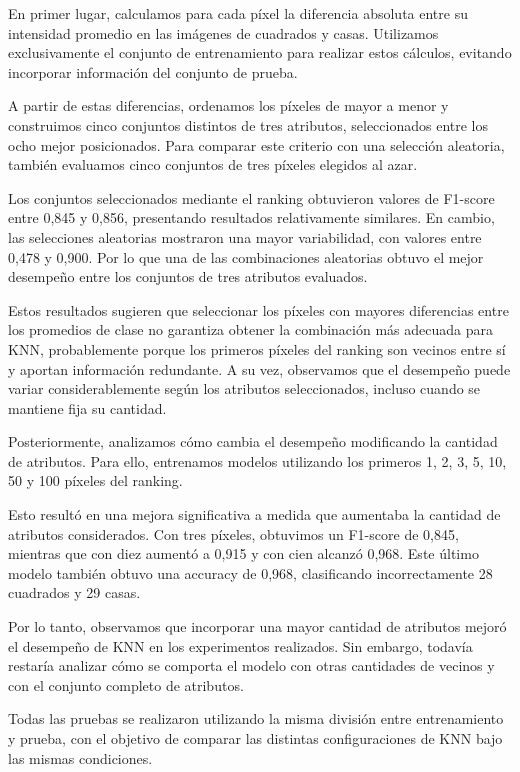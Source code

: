 \documentclass[11pt,a4paper]{article}
\begin{document}
En primer lugar, calculamos para cada píxel la
diferencia absoluta entre su intensidad promedio
en las imágenes de cuadrados y casas. Utilizamos
exclusivamente el conjunto de entrenamiento para
realizar estos cálculos, evitando incorporar
información del conjunto de prueba.

A partir de estas diferencias, ordenamos los píxeles
de mayor a menor y construimos cinco conjuntos
distintos de tres atributos, seleccionados entre
los ocho mejor posicionados. Para comparar este
criterio con una selección aleatoria, también
evaluamos cinco conjuntos de tres píxeles elegidos
al azar.

Los conjuntos seleccionados mediante el ranking
obtuvieron valores de F1-score entre 0,845 y 0,856,
presentando resultados relativamente similares.
En cambio, las selecciones aleatorias mostraron
una mayor variabilidad, con valores entre 0,478
y 0,900. Por lo que una de las combinaciones
aleatorias obtuvo el mejor desempeño entre los
conjuntos de tres atributos evaluados.

Estos resultados sugieren que seleccionar los
píxeles con mayores diferencias entre los promedios
de clase no garantiza obtener la combinación
más adecuada para KNN, probablemente porque los
primeros píxeles del ranking son vecinos entre sí
y aportan información redundante. A su vez, observamos 
que el desempeño puede variar considerablemente
según los atributos seleccionados, incluso
cuando se mantiene fija su cantidad.

Posteriormente, analizamos cómo cambia el desempeño
modificando la cantidad de atributos. Para ello,
entrenamos modelos utilizando los primeros 1, 2,
3, 5, 10, 50 y 100 píxeles del ranking.

Esto resultó en una mejora significativa a medida que
aumentaba la cantidad de atributos considerados. Con tres píxeles,
obtuvimos un F1-score de 0,845, mientras que
con diez aumentó a 0,915 y con cien alcanzó
0,968. Este último modelo también obtuvo una
accuracy de 0,968, clasificando incorrectamente 28 cuadrados y 
29 casas.

Por lo tanto, observamos que incorporar una mayor cantidad de 
atributos mejoró el desempeño de KNN en los experimentos realizados. 
Sin embargo, todavía restaría analizar cómo se comporta el modelo 
con otras cantidades de vecinos y con el conjunto completo de 
atributos.

Todas las pruebas se realizaron utilizando la misma división entre 
entrenamiento y prueba, con el objetivo de comparar las distintas 
configuraciones de KNN bajo las mismas condiciones.
\end{document}
